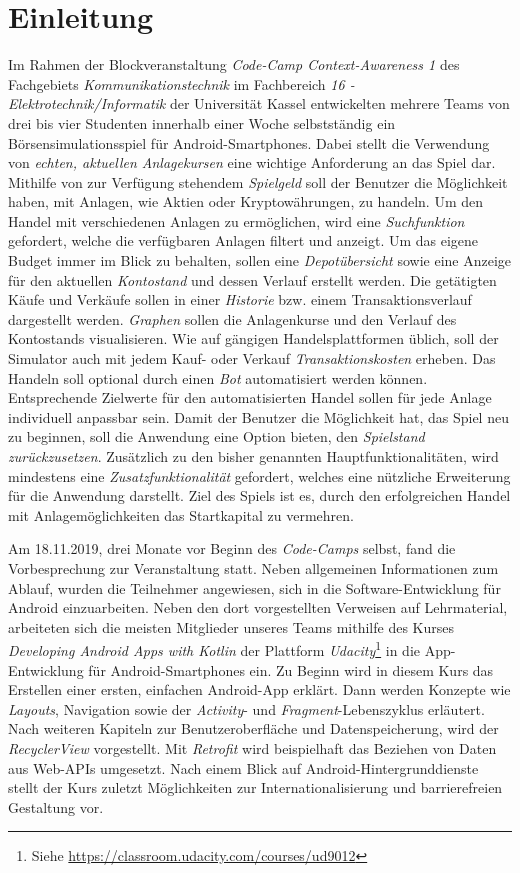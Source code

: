 \documentclass[a4paper]{article}
\begin{document}
\section{Einleitung}
\label{sec:introduction}
Im Rahmen der Blockveranstaltung \textit{Code-Camp Context-Awareness 1} des Fachgebiets \textit{Kommunikationstechnik} im Fachbereich \textit{16 - Elektrotechnik/Informatik} der Universität Kassel entwickelten mehrere Teams von drei bis vier Studenten innerhalb einer Woche selbstständig ein Börsensimulationsspiel für Android-Smartphones.
Dabei stellt die Verwendung von \textit{echten, aktuellen Anlagekursen} eine wichtige Anforderung an das Spiel dar.
Mithilfe von zur Verfügung stehendem \textit{Spielgeld} soll der Benutzer die Möglichkeit haben, mit Anlagen, wie Aktien oder Kryptowährungen, zu handeln.
Um den Handel mit verschiedenen Anlagen zu ermöglichen, wird eine \textit{Suchfunktion} gefordert, welche die verfügbaren Anlagen filtert und anzeigt.
Um das eigene Budget immer im Blick zu behalten, sollen eine \textit{Depotübersicht} sowie eine Anzeige für den aktuellen \textit{Kontostand} und dessen Verlauf erstellt werden.
Die getätigten Käufe und Verkäufe sollen in einer \textit{Historie} bzw. einem Transaktionsverlauf dargestellt werden.
\textit{Graphen} sollen die Anlagenkurse und den Verlauf des Kontostands visualisieren.
Wie auf gängigen Handelsplattformen üblich, soll der Simulator auch mit jedem Kauf- oder Verkauf \textit{Transaktionskosten} erheben.
Das Handeln soll optional durch einen \textit{Bot} automatisiert werden können.
Entsprechende Zielwerte für den automatisierten Handel sollen für jede Anlage individuell anpassbar sein.
Damit der Benutzer die Möglichkeit hat, das Spiel neu zu beginnen, soll die Anwendung eine Option bieten, den \textit{Spielstand zurückzusetzen}.
Zusätzlich zu den bisher genannten Hauptfunktionalitäten, wird mindestens eine \textit{Zusatzfunktionalität} gefordert, welches eine nützliche Erweiterung für die Anwendung darstellt.
Ziel des Spiels ist es, durch den erfolgreichen Handel mit Anlagemöglichkeiten das Startkapital zu vermehren.

Am 18.11.2019, drei Monate vor Beginn des \textit{Code-Camps} selbst, fand die Vorbesprechung zur Veranstaltung statt.
Neben allgemeinen Informationen zum Ablauf, wurden die Teilnehmer angewiesen, sich in die Software-Entwicklung für Android einzuarbeiten.
Neben den dort vorgestellten Verweisen auf Lehrmaterial, arbeiteten sich die meisten Mitglieder unseres Teams mithilfe des Kurses \textit{Developing Android Apps with Kotlin} der Plattform \textit{Udacity}\footnote{Siehe \url{https://classroom.udacity.com/courses/ud9012}} in die App-Entwicklung für Android-Smartphones ein.
Zu Beginn wird in diesem Kurs das Erstellen einer ersten, einfachen Android-App erklärt.
Dann werden Konzepte wie \textit{Layouts}, Navigation sowie der \textit{Activity}- und \textit{Fragment}-Lebenszyklus erläutert.
Nach weiteren Kapiteln zur Benutzeroberfläche und Datenspeicherung, wird der \textit{RecyclerView} vorgestellt.
Mit \textit{Retrofit} wird beispielhaft das Beziehen von Daten aus Web-APIs umgesetzt.
Nach einem Blick auf Android-Hintergrunddienste stellt der Kurs zuletzt Möglichkeiten zur Internationalisierung und barrierefreien Gestaltung vor.
\end{document}
